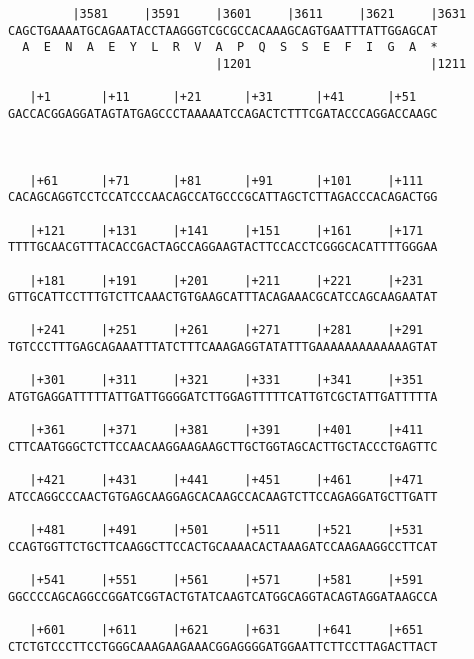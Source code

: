 \documentclass{article}
\begin{document}
\begin{Verbatim}
         |3581     |3591     |3601     |3611     |3621     |3631
CAGCTGAAAATGCAGAATACCTAAGGGTCGCGCCACAAAGCAGTGAATTTATTGGAGCAT
  A  E  N  A  E  Y  L  R  V  A  P  Q  S  S  E  F  I  G  A  *
                             |1201                         |1211
  
   |+1       |+11      |+21      |+31      |+41      |+51   
GACCACGGAGGATAGTATGAGCCCTAAAAATCCAGACTCTTTCGATACCCAGGACCAAGC
   
                                                            
  
   |+61      |+71      |+81      |+91      |+101     |+111  
CACAGCAGGTCCTCCATCCCAACAGCCATGCCCGCATTAGCTCTTAGACCCACAGACTGG
                                                            
   |+121     |+131     |+141     |+151     |+161     |+171  
TTTTGCAACGTTTACACCGACTAGCCAGGAAGTACTTCCACCTCGGGCACATTTTGGGAA
                                                            
   |+181     |+191     |+201     |+211     |+221     |+231  
GTTGCATTCCTTTGTCTTCAAACTGTGAAGCATTTACAGAAACGCATCCAGCAAGAATAT
                                                            
   |+241     |+251     |+261     |+271     |+281     |+291  
TGTCCCTTTGAGCAGAAATTTATCTTTCAAAGAGGTATATTTGAAAAAAAAAAAAAGTAT
                                                            
   |+301     |+311     |+321     |+331     |+341     |+351  
ATGTGAGGATTTTTATTGATTGGGGATCTTGGAGTTTTTCATTGTCGCTATTGATTTTTA
                                                            
   |+361     |+371     |+381     |+391     |+401     |+411  
CTTCAATGGGCTCTTCCAACAAGGAAGAAGCTTGCTGGTAGCACTTGCTACCCTGAGTTC
                                                            
   |+421     |+431     |+441     |+451     |+461     |+471  
ATCCAGGCCCAACTGTGAGCAAGGAGCACAAGCCACAAGTCTTCCAGAGGATGCTTGATT
                                                            
   |+481     |+491     |+501     |+511     |+521     |+531  
CCAGTGGTTCTGCTTCAAGGCTTCCACTGCAAAACACTAAAGATCCAAGAAGGCCTTCAT
                                                            
   |+541     |+551     |+561     |+571     |+581     |+591  
GGCCCCAGCAGGCCGGATCGGTACTGTATCAAGTCATGGCAGGTACAGTAGGATAAGCCA
                                                            
   |+601     |+611     |+621     |+631     |+641     |+651  
CTCTGTCCCTTCCTGGGCAAAGAAGAAACGGAGGGGATGGAATTCTTCCTTAGACTTACT
                                                            

\end{Verbatim}
\end{document}
